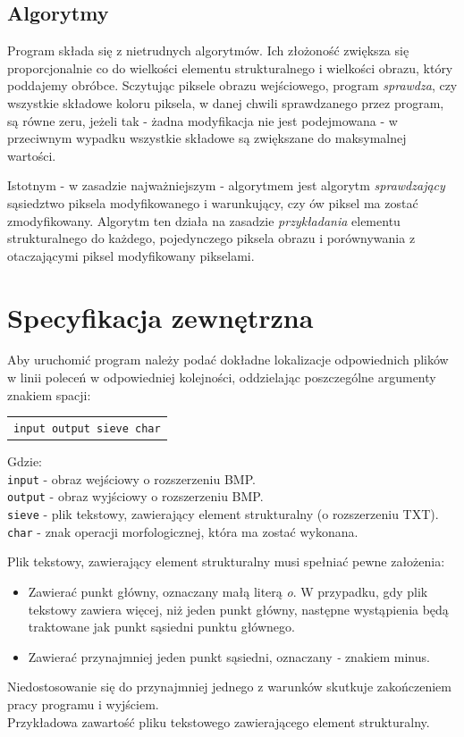 \documentclass[12pt,a4paper,twoside]{article}
\begin{document}
\subsection{Algorytmy}

Program składa się z nietrudnych algorytmów. Ich złożoność zwiększa się proporcjonalnie co do wielkości elementu strukturalnego i wielkości obrazu, który poddajemy obróbce. Sczytując piksele obrazu wejściowego, program \textit{sprawdza}, czy wszystkie składowe koloru piksela, w danej chwili sprawdzanego przez program, są równe zeru, jeżeli tak - żadna modyfikacja nie jest podejmowana - w przeciwnym wypadku wszystkie składowe są zwiększane do maksymalnej wartości. \par
Istotnym - w zasadzie najważniejszym - algorytmem jest algorytm \textit{sprawdzający} sąsiedztwo piksela modyfikowanego i warunkujący, czy ów piksel ma zostać zmodyfikowany. Algorytm ten działa na zasadzie \textit{przykładania} elementu strukturalnego do każdego, pojedynczego piksela obrazu i porównywania z otaczającymi piksel modyfikowany pikselami.


\section{Specyfikacja zewnętrzna}
\label{sec:sp:zewnetrzna}


Aby uruchomić program należy podać dokładne lokalizacje odpowiednich plików w linii poleceń w odpowiedniej kolejności, oddzielając poszczególne argumenty znakiem spacji: \par

\begin{tabular}{l}
\texttt {input output sieve char} 
\end{tabular}

Gdzie: \\
\texttt {input} - obraz wejściowy o rozszerzeniu BMP. \\
\texttt {output} - obraz wyjściowy o rozszerzeniu BMP. \\
\texttt {sieve} - plik tekstowy, zawierający element strukturalny (o rozszerzeniu TXT). \\
\texttt {char} - znak operacji morfologicznej, która ma zostać wykonana. \par
Plik tekstowy, zawierający element strukturalny musi spełniać pewne założenia:
\begin{itemize}
\item Zawierać punkt główny, oznaczany małą literą \emph{o}. W przypadku, gdy plik tekstowy zawiera więcej, niż jeden punkt główny, następne wystąpienia będą traktowane jak punkt sąsiedni punktu głównego.
\item Zawierać przynajmniej jeden punkt sąsiedni, oznaczany \emph{-} znakiem minus.
\end{itemize}
Niedostosowanie się do przynajmniej jednego z warunków skutkuje zakończeniem pracy programu i wyjściem. \\
Przykładowa zawartość pliku tekstowego zawierającego element strukturalny.
\end{document}

